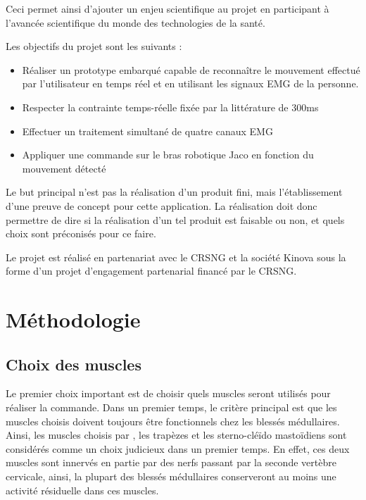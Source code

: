 \documentclass[letterpaper, twoside, 12pt, memoire, creativecommons, hyperref]{thETS}
\begin{document}
Ceci permet ainsi d'ajouter un enjeu scientifique au projet en participant à l'avancée scientifique du monde des technologies de la santé.

Les objectifs du projet sont les suivants : 

\begin{itemize}
 \item Réaliser un prototype embarqué capable de reconnaître le mouvement effectué par l'utilisateur en temps réel et en utilisant les signaux EMG de la personne.
 \item Respecter la contrainte temps-réelle fixée par la littérature de 300ms
 \item Effectuer un traitement simultané de quatre canaux EMG
 \item Appliquer une commande sur le bras robotique Jaco en fonction du mouvement détecté
\end{itemize}

Le but principal n'est pas la réalisation d'un produit fini, mais l'établissement d'une preuve de concept pour cette application. La réalisation doit donc permettre de dire si la réalisation d'un tel produit est faisable ou non, et quels choix sont préconisés pour ce faire.

Le projet est réalisé en partenariat avec le CRSNG et la société Kinova sous la forme d'un projet d'engagement partenarial financé par le CRSNG. 

\chapter{Méthodologie}
\label{CHmethodo}

\section{Choix des muscles}

Le premier choix important est de choisir quels muscles seront utilisés pour réaliser la commande. Dans un premier temps, le critère principal est que les muscles choisis doivent toujours être fonctionnels chez les blessés médullaires. Ainsi, les muscles choisis par \cite{Chang1996}, les trapèzes et les sterno-cléïdo mastoïdiens sont considérés comme un choix judicieux dans un premier temps. En effet, ces deux muscles sont innervés en partie par des nerfs passant par la seconde vertèbre cervicale, ainsi, la plupart des blessés médullaires conserveront au moins une activité résiduelle dans ces muscles. 
\end{document}
